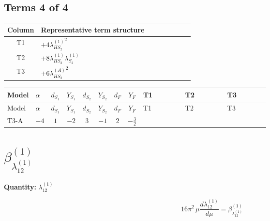 \documentclass[8pt]{article}
\begin{document}
\begin{landscape}
\subsection*{Terms 4 of 4}
\begin{center}
\begin{tabular}{@{}c >{\raggedright\arraybackslash}p{0.82\linewidth}@{}}
\toprule
Column & Representative term structure \\
\midrule
T1 & \(\displaystyle +4 {\lambda_{HS_2}^{(1)}}^2\) \\
\midrule
T2 & \(\displaystyle +8 {\lambda_{HS_2}^{(1)}} {\lambda_{S_2}^{(1)}}\) \\
\midrule
T3 & \(\displaystyle +6 {\lambda_{HS_2}^{(A)}}^2\) \\
\midrule
\bottomrule
\end{tabular}
\end{center}
\smallskip
\tiny
\begin{longtable}{@{}llcccccc >{\raggedright\arraybackslash}p{0.21\linewidth} >{\raggedright\arraybackslash}p{0.21\linewidth} >{\raggedright\arraybackslash}p{0.21\linewidth}@{}}
\toprule
Model & $\alpha$ & $d_{S_1}$ & $Y_{S_1}$ & $d_{S_2}$ & $Y_{S_2}$ & $d_F$ & $Y_F$ & T1 & T2 & T3 \\
\midrule
\endfirsthead
\toprule
Model & $\alpha$ & $d_{S_1}$ & $Y_{S_1}$ & $d_{S_2}$ & $Y_{S_2}$ & $d_F$ & $Y_F$ & T1 & T2 & T3 \\
\midrule
\endhead
T3-A & $-4$ & $1$ & $-2$ & $3$ & $-1$ & $2$ & $-\frac{3}{2}$ & \scriptsize\adjustbox{max width=\linewidth}{$\begin{gathered} +4 {\lambda_{HS_2}^{(1)}}^2\end{gathered}$} & \scriptsize\adjustbox{max width=\linewidth}{$\begin{gathered} +8 {\lambda_{HS_2}^{(1)}} {\lambda_{S_2}^{(1)}}\end{gathered}$} & \scriptsize\adjustbox{max width=\linewidth}{$\begin{gathered} +6 {\lambda_{HS_2}^{(A)}}^2\end{gathered}$} \\
\midrule
\bottomrule
\end{longtable}
\clearpage
\section*{$\beta_{\lambda_{12}^{(1)}}^{(1)}$}
\noindent\textbf{Quantity: }$\lambda_{12}^{(1)}$\par\smallskip
\[16\pi^2\,\mu\frac{d \lambda_{12}^{(1)}}{d\mu}=\beta_{\lambda_{12}^{(1)}}^{(1)}\]

\end{landscape}
\end{document}

